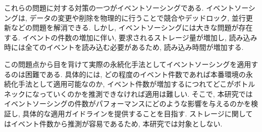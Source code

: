 \documentclass[../../main]{subfiles}
\begin{document}
    これらの問題に対する対策の一つがイベントソーシングである. イベントソーシングは, データの変更や削除を物理的に行うことで競合やデッドロック, 並行更新などの問題を解消できる. しかし, イベントソーシングには大きな問題が存在する. イベントの件数の増加に伴い, 要求されるストレージ量が増加し, 読み込み時には全てのイベントを読み込む必要があるため, 読み込み時間が増加する.

    この問題点から目を背けて実際の永続化手法としてイベントソーシングを適用するのは困難である. 具体的には, どの程度のイベント件数であれば本番環境の永続化手法として適用可能なのか, イベント件数が増加するにつれてどこがボトルネックになっていくのかを推測できなければ適用は難しい. そこで, 本研究ではイベントソーシングの件数がパフォーマンスにどのような影響を与えるのかを検証し, 具体的な適用ガイドラインを提供することを目指す. ストレージに関してはイベント件数から推測が容易であるため, 本研究では対象としない.
    \clearpage
\end{document}
